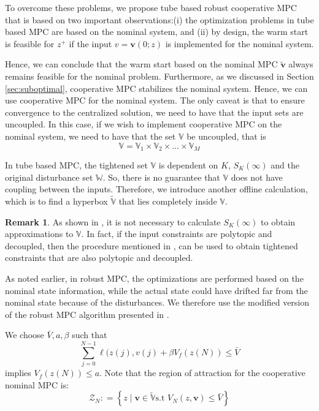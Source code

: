 \documentclass[10pt]{article}
\newcommand{\set}[1]{\left\lbrace #1 \right\rbrace}
\theoremstyle{definition}
\newtheorem{remark}[assumption]{Remark}
\begin{document}
To overcome these problems, we propose tube based robust cooperative
MPC that is based on two important observations:(i)  the optimization problems in tube based MPC are based on the
  nominal system, and (ii) by design, the warm start is feasible for $z^+$ if the input $v
  = \mathbf{v}(0;z)$ is implemented for the nominal system.

Hence, we can conclude that the warm start based on the nominal MPC
$\tilde{\mathbf{v}}$ always remains feasible for the nominal problem. Furthermore, as we
discussed in Section \ref{sec:suboptimal}, cooperative MPC stabilizes
the nominal system. Hence, we can use cooperative MPC for the nominal
system. The only caveat is that to ensure convergence to the
centralized solution, we need to have that the input sets are
uncoupled. In this case, if we wish to implement cooperative MPC on
the nominal system, we need to have that the set $\mathbb{V}$ be
uncoupled, that is 
\[ \mathbb{V} = \mathbb{V}_1 \times \mathbb{V}_2 \times \ldots \times
\mathbb{V}_M \]

In tube based MPC, the tightened set $\mathbb{V}$ is dependent
on $K$, $S_K(\infty)$ and the original disturbance set $\mathbb{W}$. So,
there is no guarantee that $\mathbb{V}$ does not have coupling between
the inputs. Therefore, we introduce another offline calculation, which
is to find a hyperbox $\tilde{\mathbb{V}}$ that lies completely inside $\mathbb{V}$. 

\begin{remark}
As shown in \citet{rakovic:kerrigan:kouramas:mayne:2003}, it is not necessary to
calculate $S_K(\infty)$ to obtain approximations to $\mathbb{V}$. In
fact, if the input constraints are polytopic and decoupled, then the
procedure mentioned in
\citet{rakovic:kerrigan:kouramas:mayne:2003}, can be used to obtain
tightened constraints that  are also polytopic and decoupled.
\end{remark} 

As noted earlier, in robust MPC, the optimizations are performed based
on the nominal state information, while the actual state could have
drifted far from the nominal state because of the disturbances. We
therefore use the modified version of the robust MPC algorithm
presented in \citet[P.234]{rawlings:mayne:2009}. 

We choose $\bar{V}, a, \beta$ such that 
\[ \sum_{j=0}^{N-1} \ell(z(j),v(j) + \beta V_f(z(N)) \leq \bar{V} \] 
implies $V_f(z(N)) \leq a$. 
Note that the region of attraction for the
cooperative nominal MPC is:
\[ \mathcal{Z}_N : = \set{z \mid \mathbf{v} \in \tilde{\mathbb{V}} \text{s.t~}
 V_N(z,\mathbf{v}) \leq \bar{V}}\]
\end{document}
